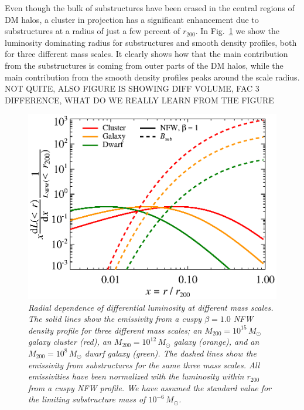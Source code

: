 \documentclass[10pt,aps,pra,reprint,amsmath,amsfonts,amssymb,showpacs]{revtex4-1}
\newcommand{\msun}{M_\odot}
\newcommand{\rvir}{r_{200}}
\newcommand{\mvir}{M_{200}}
\begin{document}
Even though the bulk of substructures have been erased in the central
regions of DM halos, a cluster in projection has a significant
enhancement due to substructures at a radius of just a few percent of
$\rvir$. In Fig.~\ref{fig:radial_emis} we show the luminosity
dominating radius for substructures and smooth density profiles, both
for three different mass scales. It clearly shows how that the main
contribution from the substructures is coming from outer parts of the
DM halos, while the main contribution from the smooth density profiles
peaks around the scale radius. NOT QUITE, ALSO FIGURE IS SHOWING DIFF
VOLUME, FAC 3 DIFFERENCE, WHAT DO WE REALLY LEARN FROM THE FIGURE
\begin{figure}
  \includegraphics[width=0.99\columnwidth]{figures/emissiv.sub.eps}
  \caption{\it Radial dependence of differential luminosity at
    different mass scales. The solid lines show the emissivity from a
    cuspy $\beta=1.0$ NFW density profile for three different mass
    scales; an $\mvir=10^{15}\,\msun$ galaxy cluster (red), an
    $\mvir=10^{12}\,\msun$ galaxy (orange), and an
    $\mvir=10^{8}\,\msun$ dwarf galaxy (green). The dashed lines show
    the emissivity from substructures for the same three mass
    scales. All emissivities have been normalized with the luminosity
    within $\rvir$ from a cuspy NFW profile. We have assumed the
    standard value for the limiting substructure mass of
    $10^{-6}\,\msun$.}
  \label{fig:radial_emis}
\end{figure}
\end{document}
